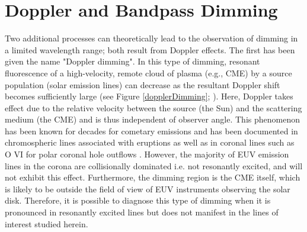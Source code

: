 \section{Doppler and Bandpass Dimming}
Two additional processes can theoretically lead to the observation of dimming in a limited wavelength range; both result from Doppler effects. The first has been given the name "Doppler dimming". In this type of dimming, resonant fluorescence of a high-velocity, remote cloud of plasma (e.g., CME) by a source population (solar emission lines) can decrease as the resultant Doppler shift becomes sufficiently large (see Figure \ref{dopplerDimming}; \citealt{Hyder1970}). Here, Doppler takes effect due to the relative velocity between the source (the Sun) and the scattering medium (the CME) and is thus independent of observer angle. This phenomenon has been known for decades for cometary emissions \citep{Swings1941, Greenstein1958} and has been documented in chromospheric lines associated with eruptions \citep{Labrosse2012} as well as in coronal lines such as O VI for polar coronal hole outflows \citep{Giordano2000}. However, the majority of EUV emission lines in the corona are collisionally dominated i.e. not resonantly excited, and will not exhibit this effect. Furthermore, the dimming region is the CME itself, which is likely to be outside the field of view of EUV instruments observing the solar disk. Therefore, it is possible to diagnose this type of dimming when it is pronounced in resonantly excited lines but does not manifest in the lines of interest studied herein. 

